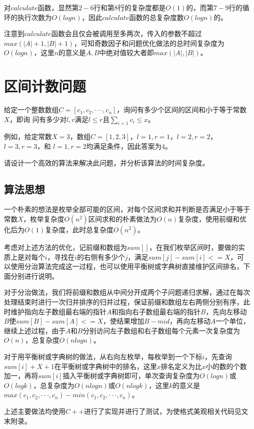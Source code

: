 \documentclass{article}
\begin{document}
对$calculate$函数，显然第$2-6$行和第$8$行的复杂度都是$O(1)$的，而第$7-9$行的循环的执行次数为$O(log n)$，因此$calculate$函数的总复杂度数$O(log n)$的。

注意到$calculate$函数会且仅会被调用至多两次，传入的参数不超过$max(|A|+1,|B|+1)$，可知奇数因子和问题优化做法的总时间复杂度为$O(log n)$，这里$n$的意义是$A,B$中绝对值较大者即$max(|A|,|B|)$。

\section{区间计数问题}

给定一个整数数组$C=[c_1,c_2,···,c_n]$，询问有多少个区间的区间和小于等于常数$X$，即询
问有多少对$l,r$满足$l\le{r}$且$\sum_{i=1}c_i\le{x}$。

例如，给定常数$X=3$，数组$C=[1,2,3]$，$l=1,r=1$，$l=2,r=2$，$l=3,r=3$，和
$l=1,r=2$均满足条件，因此答案为$4$。

请设计一个高效的算法来解决此问题，并分析该算法的时间复杂度。

\subsection{算法思想}

一个朴素的想法是枚举全部可能的区间，对每个区间求和并判断是否满足小于等于常数$X$，枚举复杂度$O(n^2)$区间求和的朴素做法为$O(n)$复杂度，使用前缀和优化后为$O(1)$复杂度，此时总复杂度$O(n^2)$。

考虑对上述方法的优化，记前缀和数组为$sum[]$，在我们枚举区间时，要做的实质上是对每个$i$，寻找在$i$的右侧有多少个$j$，满足$sum[j]-sum[i]<=X$，可以使用分治算法完成这一过程，也可以使用平衡树或字典树直接维护区间排名，下面分别进行说明。

对于分治做法，我们将前缀和数组从中间分开成两个子问题递归求解，通过在每次处理结束时进行一次归并排序的归并过程，保证前缀和数组左右两侧分别有序，此时维护指向左子数组最右端的指针$A$和指向右子数组最右端的指针$B$，先向左移动$B$使$sum[B]-sum[A]<=X$，使结果增加$B-mid$，再向左移动$A$一个单位，继续上述过程，由于$A$和$B$分别访问左子数组和右子数组每个元素一次复杂度为$O(n)$，总复杂度$O(n log n)$。

对于用平衡树或字典树的做法，从右向左枚举，每枚举到一个下标$i$，先查询$sum[i]+X+1$在平衡树或字典树中的排名，这里$x$排名定义为比$x$小的数的个数加一，再将$sum[i]$插入平衡树或字典树即可，单次查询复杂度为$O(log n)$或$O(log k)$，总复杂度为$O(n log n)$或$O(n log k)$，这里$k$的意义是$max(c_1,c_2,···,c_n)-min(c_1,c_2,···,c_n)$。

上述主要做法均使用$C++$进行了实现并进行了测试，为使格式美观相关代码见文末附录。
\end{document}
